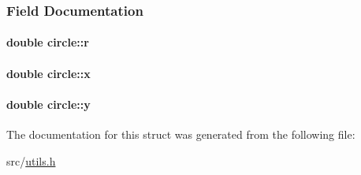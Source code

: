 \subsubsection{\-Field \-Documentation}
\hypertarget{structcircle_a5f252f6cf93b81949dbf334c74931f18}{
\paragraph[{r}]{\setlength{\rightskip}{0pt plus 5cm}double {\bf circle\-::r}}}\label{structcircle_a5f252f6cf93b81949dbf334c74931f18}
\hypertarget{structcircle_a3ecd01f4a611905b29614e61d8c6f068}{
\paragraph[{x}]{\setlength{\rightskip}{0pt plus 5cm}double {\bf circle\-::x}}}\label{structcircle_a3ecd01f4a611905b29614e61d8c6f068}
\hypertarget{structcircle_ac060cb1d497b470df6be2d4242369f31}{
\paragraph[{y}]{\setlength{\rightskip}{0pt plus 5cm}double {\bf circle\-::y}}}\label{structcircle_ac060cb1d497b470df6be2d4242369f31}


\-The documentation for this struct was generated from the following file\-:\begin{DoxyCompactItemize}
\item 
src/\hyperlink{utils_8h}{utils.\-h}\end{DoxyCompactItemize}
